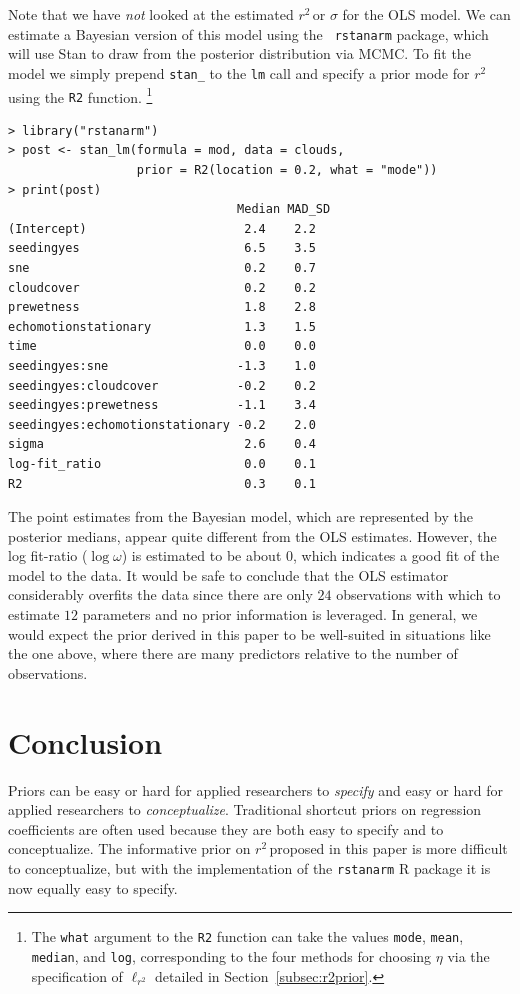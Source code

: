 \documentclass[11pt]{article}
\newcommand{\Rsq}{$r^2\,$}
\newcommand{\locRsq}{\ell_{r^2}}
\begin{document}
Note that we have \emph{not} looked at the estimated \Rsq or $\sigma$ for the
OLS model. We can estimate a Bayesian version of this model using the {\tt
rstanarm} package, which will use Stan \cite{stan} to draw from the posterior
distribution via MCMC. To fit the model we simply prepend {\tt stan\_} to the
{\tt lm} call and specify a prior mode for \Rsq using the {\tt R2} function.%
\footnote{The {\tt what} argument to the {\tt R2} function can take the values
{\tt mode}, {\tt mean}, {\tt median}, and {\tt log}, corresponding to the four
methods for choosing $\eta$ via the specification of $\locRsq$ detailed in
Section~\ref{subsec:r2prior}.}

\vspace{.5cm}
\begin{lstlisting}[frame=lines]
> library("rstanarm")
> post <- stan_lm(formula = mod, data = clouds,
                  prior = R2(location = 0.2, what = "mode"))
> print(post)
                                Median MAD_SD
(Intercept)                      2.4    2.2
seedingyes                       6.5    3.5
sne                              0.2    0.7
cloudcover                       0.2    0.2
prewetness                       1.8    2.8
echomotionstationary             1.3    1.5
time                             0.0    0.0
seedingyes:sne                  -1.3    1.0
seedingyes:cloudcover           -0.2    0.2
seedingyes:prewetness           -1.1    3.4
seedingyes:echomotionstationary -0.2    2.0
sigma                            2.6    0.4
log-fit_ratio                    0.0    0.1
R2                               0.3    0.1
\end{lstlisting}
\vspace{.5cm}

The point estimates from the Bayesian model, which are represented by the
posterior medians, appear quite different from the OLS estimates. However, the
log fit-ratio ($\log{\omega}$) is estimated to be about $0$, which indicates a
good fit of the model to the data. It would be safe to conclude that the OLS
estimator considerably overfits the data since there are only $24$ observations
with which to estimate $12$ parameters and no prior information is leveraged. In
general, we would expect the prior derived in this paper to be well-suited in
situations like the one above, where there are many predictors relative to the
number of observations.


\section{Conclusion}

Priors can be easy or hard for applied researchers to \emph{specify} and easy or
hard for applied researchers to \emph{conceptualize}. Traditional shortcut
priors on regression coefficients are often used because they are both easy to
specify and to conceptualize. The informative prior on \Rsq proposed in this
paper is more difficult to conceptualize, but with the implementation of the
{\tt rstanarm} R package it is now equally easy to specify.


\nocite{guan}
\nocite{Rcore}
\nocite{HSAUR3-package}



\end{document}
